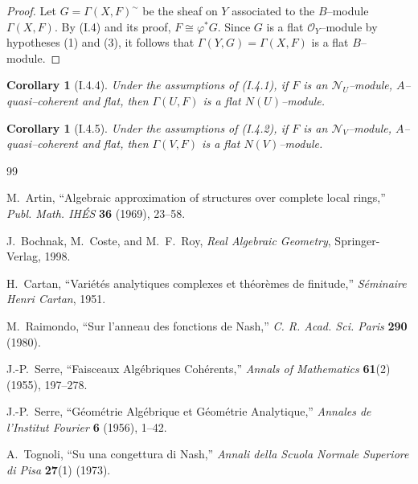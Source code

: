 \documentclass[a4paper]{amsart}
\newtheorem{cor}[theorem]{Corollary}
\theoremstyle{definition}
\theoremstyle{definition}
\begin{document}
\begin{proof}
Let $G = \Gamma(X, F)^{\sim}$ be the sheaf on $Y$ associated to the $B$–module $\Gamma(X, F)$. By (I.4) and its proof, $F \cong \varphi^* G$. Since $G$ is a flat $\mathcal{O}_Y$–module by hypotheses (1) and (3), it follows that $\Gamma(Y, G) = \Gamma(X, F)$ is a flat $B$–module.
\end{proof}

\begin{cor}[I.4.4]
Under the assumptions of (I.4.1), if $F$ is an $\mathcal{N}_U$–module, $A$–quasi–coherent and flat, then $\Gamma(U, F)$ is a flat $N(U)$–module.
\end{cor}

\begin{cor}[I.4.5]
Under the assumptions of (I.4.2), if $F$ is an $\mathcal{N}_V$–module, $A$–quasi–coherent and flat, then $\Gamma(V, F)$ is a flat $N(V)$–module.
\end{cor}






%
%


\begin{thebibliography}{99}

M.~Artin,
\newblock ``Algebraic approximation of structures over complete local rings,''
\newblock \emph{Publ. Math. IH\'ES} \textbf{36} (1969), 23--58.

J.~Bochnak, M.~Coste, and M.~F.~Roy,
\newblock \emph{Real Algebraic Geometry},
\newblock Springer-Verlag, 1998.

H.~Cartan,
\newblock ``Vari\'et\'es analytiques complexes et th\'eor\`emes de finitude,''
\newblock \emph{S\'eminaire Henri Cartan}, 1951.

M.~Raimondo,
\newblock ``Sur l'anneau des fonctions de Nash,''
\newblock \emph{C. R. Acad. Sci. Paris} \textbf{290} (1980).

J.-P.~Serre,
\newblock ``Faisceaux Alg\'ebriques Coh\'erents,''
\newblock \emph{Annals of Mathematics} \textbf{61}(2) (1955), 197--278.

J.-P.~Serre,
\newblock ``G\'eom\'etrie Alg\'ebrique et G\'eom\'etrie Analytique,''
\newblock \emph{Annales de l'Institut Fourier} \textbf{6} (1956), 1--42.

A.~Tognoli,
\newblock ``Su una congettura di Nash,''
\newblock \emph{Annali della Scuola Normale Superiore di Pisa} \textbf{27}(1) (1973).

\end{thebibliography}
\end{document}
